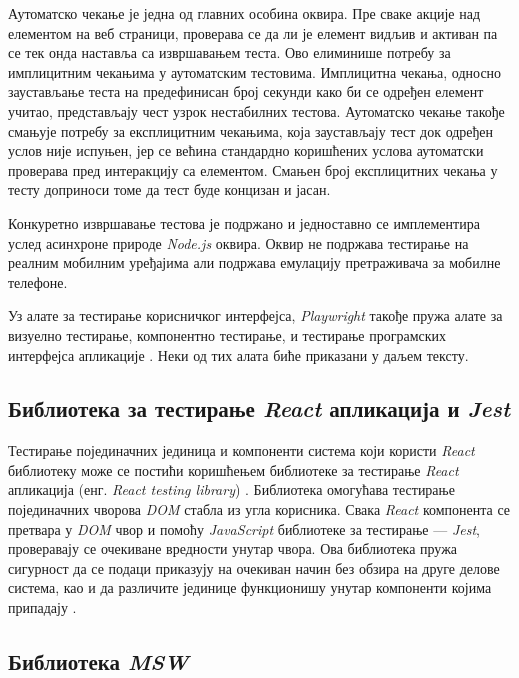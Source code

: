 \documentclass[12pt,oneside]{memoir}
\begin{document}
Аутоматско чекање је једна од главних особина оквира. Пре сваке акције над елементом на веб страници, проверава се да ли је елемент видљив и активан па се тек онда наставља са извршавањем теста. Ово елиминише потребу за имплицитним чекањима у аутоматским тестовима. Имплицитна чекања, односно заустављање теста на предефинисан број секунди како би се одређен елемент учитао, представљају чест узрок нестабилних тестова. Аутоматско чекање такође смањује потребу за експлицитним чекањима, која заустављају тест док одређен услов није испуњен, јер се већина стандардно коришћених услова аутоматски проверава пред интеракцију са елементом. Смањен број експлицитних чекања у тесту доприноси томе да тест буде концизан и јасан.

Конкуретно извршавање тестова је подржано и једноставно се имплементира услед асинхроне природе \textit{Node.js} оквира. Оквир не подржава тестирање на реалним мобилним уређајима али подржава емулацију претраживача за мобилне телефоне.

Уз алате за тестирање корисничког интерфејса, \textit{Playwright} такође пружа алате за визуелно тестирање, компонентно тестирање, и тестирање програмских интерфејса апликације \cite{playwright}. Неки од тих алата биће приказани у даљем тексту.

\subsection{Библиотека за тестирање \textit{React} апликација и  \textit{Jest}}

Тестирање појединачних јединица и компоненти система који користи \textit{React} библиотеку може се постићи коришћењем библиотеке за тестирање \textit{React} апликација (енг.\textit{ React testing library}) \cite{rtl}. Библиотека омогућава тестирање појединачних чворова \textit{DOM} стабла из угла корисника. Свака \textit{React} компонента се претвара у \textit{DOM} чвор и помоћу \textit{JavaScript} библиотеке за тестирање --- \textit{Jest}, проверавају се очекиване вредности унутар чвора. Ова библиотека пружа сигурност да се подаци приказују на очекиван начин без обзира на друге делове система, као и да различите јединице функционишу унутар компоненти којима припадају \cite{rtl,jest}.



\subsection{Библиотека \textit{MSW}}
\end{document}
